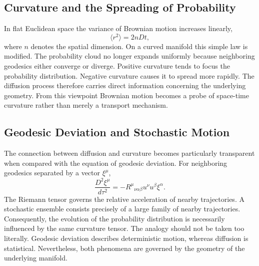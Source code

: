\subsection{Curvature and the Spreading of Probability}
In flat Euclidean space the variance of Brownian motion increases
linearly,
\begin{equation}
\langle r^2\rangle=2nDt,
\end{equation}
where $n$ denotes the spatial dimension.
On a curved manifold this simple law is modified.
The probability cloud no longer expands uniformly because neighboring
geodesics either converge or diverge.
Positive curvature tends to focus the probability distribution.
Negative curvature causes it to spread more rapidly.
The diffusion process therefore carries direct information concerning
the underlying geometry.
From this viewpoint Brownian motion becomes a probe of space-time
curvature rather than merely a transport mechanism.
\subsection{Geodesic Deviation and Stochastic Motion}
The connection between diffusion and curvature becomes particularly
transparent when compared with the equation of geodesic deviation.
For neighboring geodesics separated by a vector
$\xi^\mu$,
\begin{equation}
\frac{D^2\xi^\mu}{d\tau^2}=-R^\mu{}_{\nu\alpha\beta}u^\nu u^\beta\xi^\alpha .
\label{eq:GeoDeviation}
\end{equation}
The Riemann tensor governs the relative acceleration of nearby
trajectories.
A stochastic ensemble consists precisely of a large family of nearby
trajectories.
Consequently, the evolution of the probability distribution is
necessarily influenced by the same curvature tensor.
The analogy should not be taken too literally.
Geodesic deviation describes deterministic motion, whereas diffusion is
statistical.
Nevertheless, both phenomena are governed by the geometry of the
underlying manifold.
